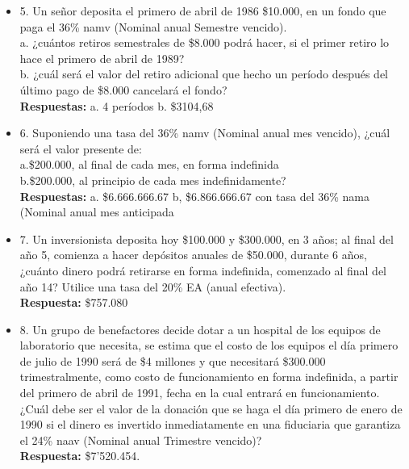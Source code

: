 \begin{itemize}
	\item 5. Un señor deposita el primero de abril de 1986 \$10.000, en un fondo que paga el 36\% namv (Nominal anual Semestre vencido).\\
	
	a. ¿cuántos retiros semestrales de \$8.000 podrá hacer, si el primer retiro lo hace el primero de abril de 1989?\\
	b. ¿cuál será el valor del retiro adicional que hecho un período después del último pago de \$8.000 cancelará el fondo?\\
	\textbf{Respuestas:} a. 4 períodos \hspace{1,0cm} b. \$3104,68\\
	\medskip
	
	\item 6. Suponiendo una tasa del 36\% namv (Nominal anual mes vencido), ¿cuál será el valor presente de:\\
	
	a.\$200.000, al final de cada mes, en forma indefinida\\
	b.\$200.000, al principio de cada mes indefinidamente?\\
	\textbf{Respuestas:} a. \$6.666.666.67 \hspace{0,5 cm}b, \$6.866.666.67 con tasa del 36\% nama (Nominal anual mes anticipada\\
	\medskip
	
	\item 7. Un inversionista deposita hoy \$100.000 y \$300.000, en 3 años; al final del año 5, comienza a hacer depósitos anuales de \$50.000, durante 6 años, ¿cuánto dinero podrá retirarse en forma indefinida, comenzado al final del año 14? Utilice una tasa del 20\% EA (anual efectiva).\\
	\textbf{Respuesta:} \$757.080\\
	\medskip
	
	\item 8. Un grupo de benefactores decide dotar a un hospital de los equipos de laboratorio que necesita, se estima que el costo de los equipos el día primero de julio de 1990 será de \$4 millones y que necesitará \$300.000 trimestralmente, como costo de funcionamiento en forma indefinida, a partir del primero de abril de 1991, fecha en la cual entrará en funcionamiento. ¿Cuál debe ser el valor de la donación que se haga el día primero de enero de 1990 si el dinero es invertido inmediatamente en una fiduciaria que garantiza el 24\%  naav (Nominal anual Trimestre vencido)?\\
	\textbf{Respuesta:} \$7'520.454.\\
	\medskip
	

\end{itemize}
